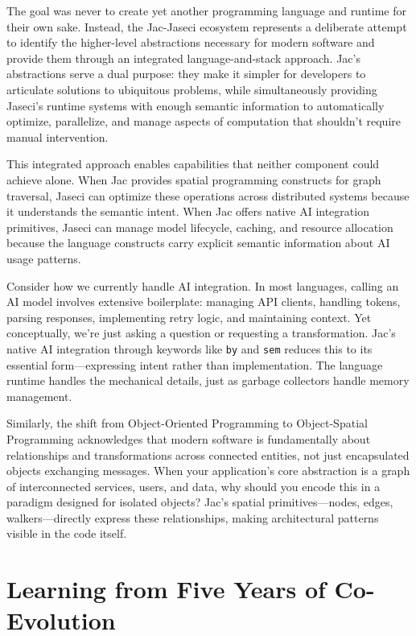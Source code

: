 The goal was never to create yet another programming language and runtime for their own sake. Instead, the Jac-Jaseci ecosystem represents a deliberate attempt to identify the higher-level abstractions necessary for modern software and provide them through an integrated language-and-stack approach. Jac's abstractions serve a dual purpose: they make it simpler for developers to articulate solutions to ubiquitous problems, while simultaneously providing Jaseci's runtime systems with enough semantic information to automatically optimize, parallelize, and manage aspects of computation that shouldn't require manual intervention.

This integrated approach enables capabilities that neither component could achieve alone. When Jac provides spatial programming constructs for graph traversal, Jaseci can optimize these operations across distributed systems because it understands the semantic intent. When Jac offers native AI integration primitives, Jaseci can manage model lifecycle, caching, and resource allocation because the language constructs carry explicit semantic information about AI usage patterns.

Consider how we currently handle AI integration. In most languages, calling an AI model involves extensive boilerplate: managing API clients, handling tokens, parsing responses, implementing retry logic, and maintaining context. Yet conceptually, we're just asking a question or requesting a transformation. Jac's native AI integration through keywords like \texttt{by} and \texttt{sem} reduces this to its essential form—expressing intent rather than implementation. The language runtime handles the mechanical details, just as garbage collectors handle memory management.

Similarly, the shift from Object-Oriented Programming to Object-Spatial Programming acknowledges that modern software is fundamentally about relationships and transformations across connected entities, not just encapsulated objects exchanging messages. When your application's core abstraction is a graph of interconnected services, users, and data, why should you encode this in a paradigm designed for isolated objects? Jac's spatial primitives—nodes, edges, walkers—directly express these relationships, making architectural patterns visible in the code itself.

\section{Learning from Five Years of Co-Evolution}


